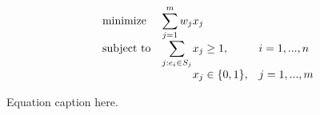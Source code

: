 \documentclass[spanish]{article}
\begin{document}
		\begin{eqfloat}
			\begin{equation}
				\begin{array}{ll@{}ll}
				\text{minimize}  & \displaystyle\sum\limits_{j=1}^{m} w_{j}&x_{j} &\\
				\text{subject to}& \displaystyle\sum\limits_{j:e_{i} \in S_{j}}   &x_{j} \geq 1,  &i=1 ,..., n\\
												 &                                                &x_{j} \in \{0,1\}, &j=1 ,..., m
				\end{array}
			\end{equation}
      \caption{Equation caption here.}
      \label{eq:p_center}
    \end{eqfloat}

	\nocite{subject:mio}
	
  
\end{document}
